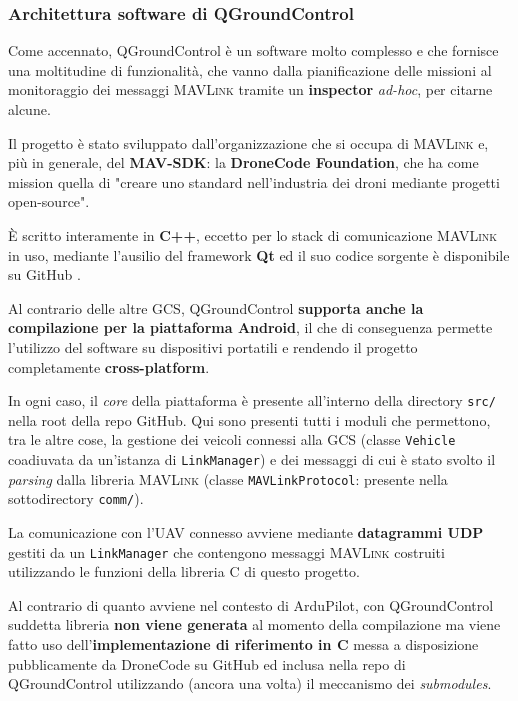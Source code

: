 \documentclass[a4paper, 12pt, oneside]{article}
\theoremstyle{definition}
\begin{document}
\subsubsection{Architettura software di QGroundControl}

Come accennato, QGroundControl è un software molto complesso e che fornisce una moltitudine di funzionalità, che vanno dalla pianificazione delle missioni al monitoraggio dei messaggi \textsc{MAVLink} tramite un \textbf{inspector} \textit{ad-hoc}, per citarne alcune.

Il progetto è stato sviluppato dall'organizzazione che si occupa di \textsc{MAVLink} e, più in generale, del \textbf{MAV-SDK}: la \textbf{DroneCode Foundation}, che ha come mission quella di "creare uno standard nell'industria dei droni mediante progetti open-source"\cite{dronecode}. 

È scritto interamente in \textbf{C++}, eccetto per lo stack di comunicazione \textsc{MAVLink} in uso, mediante l'ausilio del framework \textbf{Qt} ed il suo codice sorgente è disponibile su GitHub \cite{qgc-github}.

Al contrario delle altre GCS, QGroundControl \textbf{supporta anche la compilazione per la piattaforma Android}\cite{qgc-github-android}, il che di conseguenza permette l'utilizzo del software su dispositivi portatili e rendendo il progetto completamente \textbf{cross-platform}.

In ogni caso, il \textit{core} della piattaforma è presente all'interno della directory \texttt{src/} nella root della repo GitHub. Qui sono presenti tutti i moduli che permettono, tra le altre cose, la gestione dei veicoli connessi alla GCS (classe \texttt{Vehicle} coadiuvata da un'istanza di \texttt{LinkManager}) e dei messaggi di cui è stato svolto il \textit{parsing} dalla libreria \textsc{MAVLink} (classe \texttt{MAVLinkProtocol}: presente nella sottodirectory \texttt{comm/}).

La comunicazione con l'UAV connesso avviene mediante \textbf{datagrammi UDP} gestiti da un \texttt{LinkManager} che contengono messaggi \textsc{MAVLink} costruiti utilizzando le funzioni della libreria C di questo progetto.

Al contrario di quanto avviene nel contesto di ArduPilot, con QGroundControl suddetta libreria \textbf{non viene generata} al momento della compilazione ma viene fatto uso dell'\textbf{implementazione di riferimento in C} \cite{mavlink-c-implementation} messa a disposizione pubblicamente da DroneCode su GitHub ed inclusa nella repo di QGroundControl utilizzando (ancora una volta) il meccanismo dei \textit{submodules}.
\end{document}
